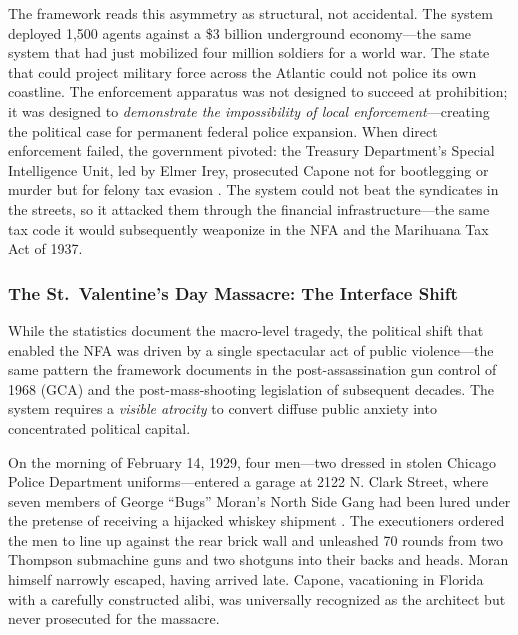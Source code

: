 \documentclass[12pt,openany]{book}
\begin{document}
The framework reads this asymmetry as structural, not accidental. The system deployed 1,500 agents against a \$3 billion underground economy---the same system that had just mobilized four million soldiers for a world war. The state that could project military force across the Atlantic could not police its own coastline. The enforcement apparatus was not designed to succeed at prohibition; it was designed to \textit{demonstrate the impossibility of local enforcement}---creating the political case for permanent federal police expansion. When direct enforcement failed, the government pivoted: the Treasury Department's Special Intelligence Unit, led by Elmer Irey, prosecuted Capone not for bootlegging or murder but for felony tax evasion \cite{fbi_gangster}. The system could not beat the syndicates in the streets, so it attacked them through the financial infrastructure---the same tax code it would subsequently weaponize in the NFA and the Marihuana Tax Act of 1937.

\subsubsection{The St.\ Valentine's Day Massacre: The Interface Shift}

While the statistics document the macro-level tragedy, the political shift that enabled the NFA was driven by a single spectacular act of public violence---the same pattern the framework documents in the post-assassination gun control of 1968 (GCA) and the post-mass-shooting legislation of subsequent decades. The system requires a \textit{visible atrocity} to convert diffuse public anxiety into concentrated political capital.

On the morning of February 14, 1929, four men---two dressed in stolen Chicago Police Department uniforms---entered a garage at 2122 N. Clark Street, where seven members of George ``Bugs'' Moran's North Side Gang had been lured under the pretense of receiving a hijacked whiskey shipment \cite{wikipedia_valentine, chicago_valentine, michiganology_valentine}. The executioners ordered the men to line up against the rear brick wall and unleashed 70 rounds from two Thompson submachine guns and two shotguns into their backs and heads. Moran himself narrowly escaped, having arrived late. Capone, vacationing in Florida with a carefully constructed alibi, was universally recognized as the architect but never prosecuted for the massacre.
\end{document}
